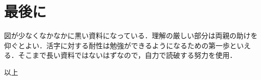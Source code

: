 \documentclass[dvipdfmx]{jsarticle}
\begin{document}
    \section*{最後に}
    図が少なくなかなかに黒い資料になっている．理解の厳しい部分は両親の助けを仰ぐとよい．活字に対する耐性は勉強ができるようになるための第一歩といえる．そこまで長い資料ではないはずなので，自力で読破する努力を使用．

    \vspace{5cm}
    以上
\end{document}

